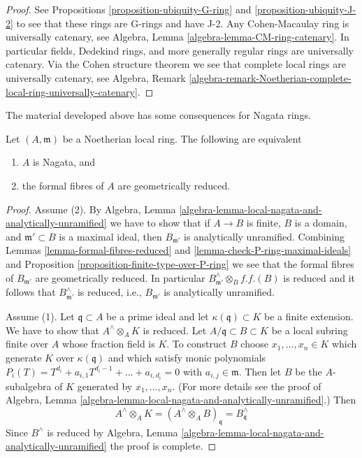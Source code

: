 \begin{proof}
See Propositions \ref{proposition-ubiquity-G-ring} and
\ref{proposition-ubiquity-J-2} to see that these rings are
G-rings and have J-2. Any Cohen-Macaulay ring is universally
catenary, see Algebra, Lemma \ref{algebra-lemma-CM-ring-catenary}.
In particular fields, Dedekind rings, and more generally
regular rings are universally catenary. Via the Cohen structure theorem 
we see that complete local rings are universally catenary, see
Algebra, Remark
\ref{algebra-remark-Noetherian-complete-local-ring-universally-catenary}.
\end{proof}

\noindent
The material developed above has some consequences for Nagata rings.

\begin{lemma}
\label{lemma-Nagata-local-ring}
Let $(A, \mathfrak m)$ be a Noetherian local ring.
The following are equivalent
\begin{enumerate}
\item $A$ is Nagata, and
\item the formal fibres of $A$ are geometrically reduced.
\end{enumerate}
\end{lemma}

\begin{proof}
Assume (2). By
Algebra, Lemma \ref{algebra-lemma-local-nagata-and-analytically-unramified}
we have to show that if $A \to B$ is finite, $B$ is a domain,
and $\mathfrak m' \subset B$ is a maximal ideal, then $B_{\mathfrak m'}$
is analytically unramified.
Combining Lemmas \ref{lemma-formal-fibres-reduced} and
\ref{lemma-check-P-ring-maximal-ideals} and
Proposition \ref{proposition-finite-type-over-P-ring}
we see that the formal fibres of $B_{\mathfrak m'}$ are
geometrically reduced. In particular
$B_{\mathfrak m'}^\wedge \otimes_B f.f.(B)$ is reduced
and it follows that $B_{\mathfrak m'}^\wedge$ is reduced, i.e.,
$B_{\mathfrak m'}$ is analytically unramified.

\medskip\noindent
Assume (1). Let $\mathfrak q \subset A$ be a prime ideal
and let $\kappa(\mathfrak q) \subset K$ be a finite extension.
We have to show that $A^\wedge \otimes_A K$ is reduced.
Let $A/\mathfrak q \subset B \subset K$ be a local subring
finite over $A$ whose fraction field is $K$.
To construct $B$ choose $x_1, \ldots, x_n \in K$
which generate $K$ over $\kappa(\mathfrak q)$
and which satisfy monic polynomials
$P_i(T) = T^{d_i} + a_{i, 1} T^{d_i - 1} + \ldots + a_{i, d_i} = 0$
with $a_{i, j} \in \mathfrak m$. Then let $B$ be the $A$-subalgebra
of $K$ generated by $x_1, \ldots, x_n$. (For more details see
the proof of Algebra, Lemma
\ref{algebra-lemma-local-nagata-and-analytically-unramified}.)
Then
$$
A^\wedge \otimes_A K =
(A^\wedge \otimes_A B)_\mathfrak q =
B^\wedge_\mathfrak q
$$
Since $B^\wedge$ is reduced by  Algebra, Lemma
\ref{algebra-lemma-local-nagata-and-analytically-unramified}
the proof is complete.
\end{proof}

